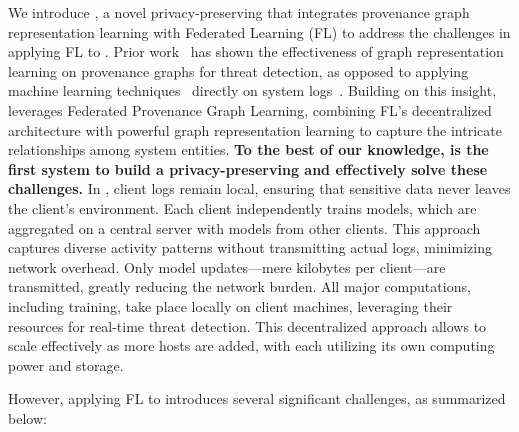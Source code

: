 \smallskip
{}
\smallskip

\noindent
We introduce \Sys, a novel privacy-preserving \pids that integrates provenance graph representation learning with Federated Learning (FL) to address the challenges in applying FL to \pids. Prior work~\cite{wang2022threatrace} has shown the effectiveness of graph representation learning on provenance graphs for threat detection, as opposed to applying machine learning techniques~\cite{chowdhary2020natural, goodfellow2020generative} directly on system logs~\cite{deeplog2017, xia2019loggan}. Building on this insight, \Sys leverages Federated Provenance Graph Learning, combining FL’s decentralized architecture with powerful graph representation learning to capture the intricate relationships among system entities. {\bf To the best of our knowledge, \Sys is the first system to build a privacy-preserving \pids and effectively solve these challenges.} In \Sys, client logs remain local, ensuring that sensitive data never leaves the client's environment. Each client independently trains \gnnshort models, which are aggregated on a central server with models from other clients. This approach captures diverse activity patterns without transmitting actual logs, minimizing network overhead. Only model updates—mere kilobytes per client—are transmitted, greatly reducing the network burden. All major computations, including training, take place locally on client machines, leveraging their resources for real-time threat detection. This decentralized approach allows \Sys to scale effectively as more hosts are added, with each utilizing its own computing power and storage.

However, applying FL to \pids introduces several significant challenges, as summarized below:

